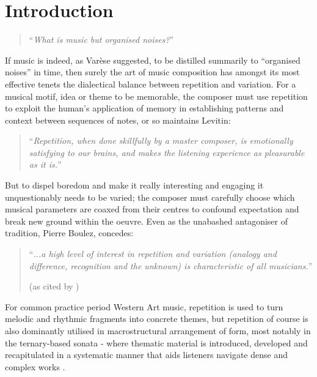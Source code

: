 
\chapter{Introduction}
\label{chap:intro}

\blockcquote[]{Varese1966}{``\textit{What is music but organised noises?}''}

If music is indeed, as Varèse suggested, to be distilled summarily to “organised noises” in time, then surely the art of music composition has amongst its most effective tenets the dialectical balance between repetition and variation. For a musical motif, idea or theme to be memorable, the composer must use repetition to exploit the human's application of memory in establishing patterns and context between sequences of notes, or so maintains Levitin:

\blockcquote[]{Levitin}{``\textit{Repetition, when done skillfully by a master composer, is emotionally satisfying to our brains, and makes the listening experience as pleasurable as it is.}''}

But to dispel boredom and make it really interesting and engaging it unquestionably needs to be varied; the composer must carefully choose which musical parameters are coaxed from their centres to confound expectation and break new ground within the oeuvre. Even as the unabashed antagoniser of tradition, Pierre Boulez, concedes:


\blockquote{``\textit{...a high level of interest in repetition and variation (analogy and difference, recognition and the unknown) is characteristic of all musicians.}''
\begin{flushright}
(as cited by \cite{Campbell1997})
\end{flushright}
}

For common practice period Western Art music, repetition is used to turn melodic and rhythmic fragments into concrete themes, but repetition of course is also dominantly utilised in macrostructural arrangement of form, most notably in the ternary-based sonata - where thematic material is introduced, developed and recapitulated in a systematic manner that aids listeners navigate dense and complex works \citep{Benward2008}.

